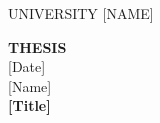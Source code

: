 \documentclass[12pt,a4paper]{book}
\begin{document}
\begin{titlepage}


\begin{center}
UNIVERSITY [NAME]\\
\vspace*{0,5cm}
\end{center}
\vspace*{1cm}
\begin{center}
{\large{\textbf{THESIS}}}\\
\vspace*{1,5cm}
[Date] \\
\vspace*{0,5cm}
[Name]\\

\vspace*{2cm}
\LARGE{\textbf{[Title]}}
\vspace*{1cm}
\end{center}
\vspace*{1cm}

\clearpage
\end{titlepage}
\end{document}
